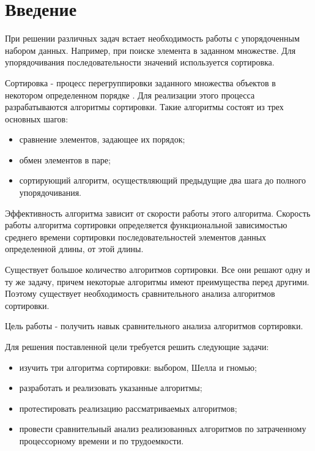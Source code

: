 \chapter*{Введение}

При решении различных задач встает необходимость работы с упорядоченным набором данных. Например, при поиске элемента в заданном множестве. Для упорядочивания последовательности значений используется сортировка.

Сортировка - процесс перегруппировки заданного множества объектов в некотором определенном порядке \cite{virt}. Для реализации этого процесса разрабатываются алгоритмы сортировки. Такие алгоритмы состоят из трех основных шагов: 

\begin{itemize}
	\item сравнение элементов, задающее их порядок;
	\item обмен элементов в паре;
	\item сортирующий алгоритм, осуществляющий предыдущие два шага до полного упорядочивания.
\end{itemize}

Эффективность алгоритма зависит от скорости работы этого алгоритма. Скорость работы алгоритма сортировки определяется функциональной зависимостью среднего времени сортировки последовательностей элементов
данных определенной длины, от этой длины.

Существует большое количество алгоритмов сортировки. Все они решают одну и ту же задачу, причем некоторые алгоритмы имеют преимущества перед другими. Поэтому существует необходимость сравнительного анализа алгоритмов сортировки. 

Цель работы - получить навык сравнительного анализа алгоритмов сортировки.

Для решения поставленной цели требуется решить следующие задачи:

\begin{itemize}
	\item изучить три алгоритма сортировки: выбором, Шелла и гномью;
	\item разработать и реализовать указанные алгоритмы;
	\item протестировать реализацию рассматриваемых алгоритмов;
	\item провести сравнительный анализ реализованных алгоритмов по затраченному процессорному времени и по трудоемкости.
\end{itemize}